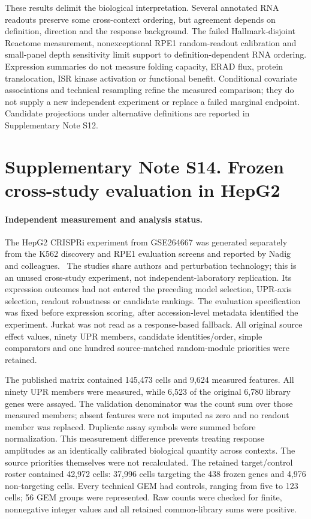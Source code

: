 \documentclass[a4paper,fleqn]{cas-sc}
\makeatletter
\DeclareRobustCommand{\rev}[1]{{\color{red}\def\@citecolor{black}\def\@linkcolor{red}\def\@urlcolor{red}#1}}
\let\unmarkedcite\cite
\renewcommand{\cite}[1]{{\color{black}\def\@citecolor{black}\unmarkedcite{#1}}}
\makeatother
\begin{document}
\rev{These results delimit the biological interpretation.} \rev{Several annotated RNA readouts preserve some cross-context ordering, but agreement depends on definition, direction and the response background.} \rev{The failed Hallmark-disjoint Reactome measurement, nonexceptional RPE1 random-readout calibration and small-panel depth sensitivity limit support to definition-dependent RNA ordering.} \rev{Expression summaries do not measure folding capacity, ERAD flux, protein translocation, ISR kinase activation or functional benefit.} \rev{Conditional covariate associations and technical resampling refine the measured comparison; they do not supply a new independent experiment or replace a failed marginal endpoint.} \rev{Candidate projections under alternative definitions are reported in Supplementary Note S12.}



\clearpage
\section*{\rev{Supplementary Note S14. Frozen cross-study evaluation in HepG2}}

\paragraph{\rev{Independent measurement and analysis status.}}
\rev{The HepG2 CRISPRi experiment from GSE264667 was generated separately from the K562 discovery and RPE1 evaluation screens and reported by Nadig and colleagues.~\cite{nadig2025}} \rev{The studies share authors and perturbation technology; this is an unused cross-study experiment, not independent-laboratory replication.} \rev{Its expression outcomes had not entered the preceding model selection, UPR-axis selection, readout robustness or candidate rankings.} \rev{The evaluation specification was fixed before expression scoring, after accession-level metadata identified the experiment.} \rev{Jurkat was not read as a response-based fallback.} \rev{All original source effect values, ninety UPR members, candidate identities/order, simple comparators and one hundred source-matched random-module priorities were retained.}

\rev{The published matrix contained 145,473 cells and 9,624 measured features.} \rev{All ninety UPR members were measured, while 6,523 of the original 6,780 library genes were assayed.} \rev{The validation denominator was the count sum over those measured members; absent features were not imputed as zero and no readout member was replaced.} \rev{Duplicate assay symbols were summed before normalization.} \rev{This measurement difference prevents treating response amplitudes as an identically calibrated biological quantity across contexts.} \rev{The source priorities themselves were not recalculated.} \rev{The retained target/control roster contained 42,972 cells: 37,996 cells targeting the 438 frozen genes and 4,976 non-targeting cells.} \rev{Every technical GEM had controls, ranging from five to 123 cells; 56 GEM groups were represented.} \rev{Raw counts were checked for finite, nonnegative integer values and all retained common-library sums were positive.}
\end{document}
